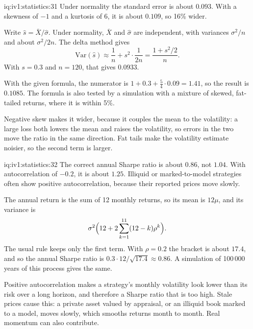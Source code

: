 \begin{solution}{iq:iv1:statistics:31}
Under normality the standard error is about $0.093$. With a skewness of $-1$ and a kurtosis of 6, it is about $0.109$, so 16\% wider.

Write $\hat{s} = \bar{X}/\hat\sigma$. Under normality, $\bar{X}$ and $\hat\sigma$ are independent, with variances $\sigma^2/n$ and about $\sigma^2/2n$. The delta method gives
\[
\mathrm{Var}(\hat{s}) \approx \frac{1}{n} + s^2 \cdot \frac{1}{2n} = \frac{1 + s^2/2}{n}.
\]
With $s = 0.3$ and $n = 120$, that gives $0.0933$.

With the given formula, the numerator is $1 + 0.3 + \frac54 \cdot 0.09 = 1.41$, so the result is $0.1085$. The formula is also tested by a simulation with a mixture of skewed, fat-tailed returns, where it is within 5\%.

Negative skew makes it wider, because it couples the mean to the volatility: a large loss both lowers the mean and raises the volatility, so errors in the two move the ratio in the same direction. Fat tails make the volatility estimate noisier, so the second term is larger.

\end{solution}

\begin{solution}{iq:iv1:statistics:32}
The correct annual Sharpe ratio is about $0.86$, not $1.04$. With autocorrelation of $-0.2$, it is about $1.25$. Illiquid or marked-to-model strategies often show positive autocorrelation, because their reported prices move slowly.

The annual return is the sum of 12 monthly returns, so its mean is $12\mu$, and its variance is
\[
\sigma^2\Bigl(12 + 2\sum_{k = 1}^{11}(12 - k)\rho^k\Bigr).
\]
The usual rule keeps only the first term. With $\rho = 0.2$ the bracket is about $17.4$, and so the annual Sharpe ratio is $0.3 \cdot 12/\sqrt{17.4} \approx 0.86$. A simulation of 100\,000 years of this process gives the same.

Positive autocorrelation makes a strategy's monthly volatility look lower than its risk over a long horizon, and therefore a Sharpe ratio that is too high. Stale prices cause this: a private asset valued by appraisal, or an illiquid book marked to a model, moves slowly, which smooths returns month to month. Real momentum can also contribute.

\end{solution}

